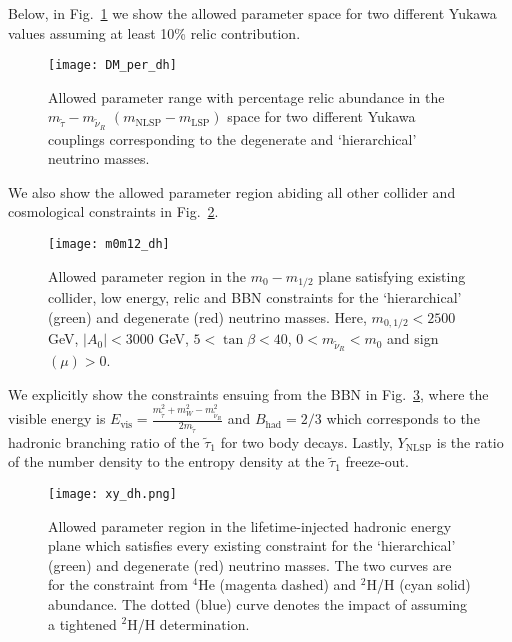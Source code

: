 \documentclass[10pt]{article}
\newcommand{\stau}{\tilde{\tau}}
\begin{document}
Below, in Fig.~\ref{fig:DM_per} we show the allowed parameter space for two different Yukawa values assuming at least 10\% relic contribution.
\begin{figure}[t]
	\begin{center}
		{
			\texttt{[image: DM\_per\_dh]}
			\caption{Allowed parameter range with percentage relic abundance in the $m_{\stau}-m_{\tilde{\nu}_R}$ $(m_{\textrm{NLSP}}-m_{\textrm{LSP}})$ space for two different Yukawa couplings corresponding to the degenerate and `hierarchical'  neutrino masses. }
			\label{fig:DM_per}}
	\end{center}
\end{figure}
We also show the allowed parameter region abiding all other collider and cosmological constraints in Fig.~\ref{fig:m0m12}.
\begin{figure}[!htb]
	\begin{center}
		{
			\texttt{[image: m0m12\_dh]}
			\caption{Allowed parameter region in the $m_0-m_{1/2}$ plane satisfying existing collider, low energy, relic and BBN constraints for the `hierarchical' (green) and degenerate (red) neutrino masses. Here, $m_{0,1/2} < 2500$ GeV, $|A_0| < 3000$ GeV, $5 < \tan{\beta} < 40$, $0 < m_{\tilde{\nu}_R} < m_0$ and sign$(\mu) > 0$.}
			\label{fig:m0m12}}
	\end{center}
\end{figure}
We explicitly show the constraints ensuing from the BBN in Fig.~\ref{fig:BBN}, where the visible energy is $E_\text{vis}=\frac{m_{\stau}^2+m_W^2-m_{\tilde{\nu}_R}^2}{2 m_{\stau}}$ and $B_\text{had} = 2/3$ which corresponds to the hadronic branching ratio of the $\tilde{\tau}_1$ for two body decays. Lastly, $Y_\text{NLSP}$ is the ratio of the number density to the entropy density at the $\tilde{\tau}_1$ freeze-out.

\begin{figure}[t]
	\hspace*{-0.3cm}
	\begin{center}
		{
			\texttt{[image: xy\_dh.png]}
			\caption{Allowed parameter region in the lifetime-injected hadronic energy plane which satisfies every existing constraint for the `hierarchical' (green) and degenerate (red) neutrino masses. The two curves are for the constraint from $^4$He (magenta dashed) and $^2$H/H (cyan solid) abundance. The dotted (blue) curve denotes the impact of assuming a tightened $^2$H/H determination.}
			\label{fig:BBN}}
	\end{center}
\end{figure}
\end{document}

